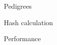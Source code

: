 \documentclass[aspectratio=169, 14pt]{beamer}
\begin{document}
\begin{large}
\begin{frame}{Pedigrees}
\begin{itemize}
  \end{itemize}
  
 
 \end{frame}


 \begin{frame}{Hash calculation}
  \begin{figure}
   \scalebox{.5}{}
  \end{figure}
 \end{frame}
 
 
 \begin{frame}{Performance}
   \begin{figure}
   \scalebox{.4}{}
   \label{USERTIME}
  \end{figure}
 \end{frame}

 
 \end{large}
\end{document}
